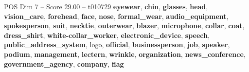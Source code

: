 \begin{textsample}{POS Dim 7 – Score 29.00 – t010729}  \label{ex:f7_pos_005}
\textbf{eyewear}, \textbf{chin}, \textbf{glasses}, \textbf{head}, \textbf{vision\_care}, \textbf{forehead}, \textbf{face}, \textbf{nose}, \textbf{formal\_wear}, \textbf{audio\_equipment}, \textbf{spokesperson}, \textbf{suit}, \textbf{necktie}, \textbf{outerwear}, \textbf{blazer}, \textbf{microphone}, \textbf{collar}, \textbf{coat}, \textbf{dress\_shirt}, \textbf{white-collar\_worker}, \textbf{electronic\_device}, \textbf{speech}, \textbf{public\_address\_system}, logo, \textbf{official}, \textbf{businessperson}, \textbf{job}, \textbf{speaker}, \textbf{podium}, \textbf{management}, \textbf{lectern}, \textbf{wrinkle}, \textbf{organization}, \textbf{news\_conference}, \textbf{government\_agency}, \textbf{company}, \textbf{flag}

\end{textsample}

